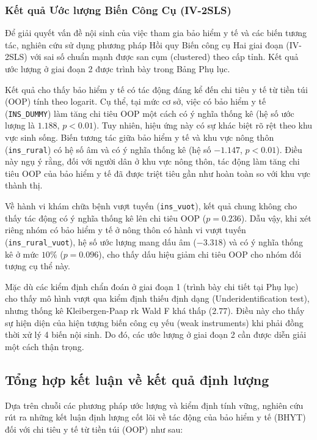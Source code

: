 \documentclass[12pt,a4paper]{article}
\begin{document}
\subsubsection{Kết quả Ước lượng Biến Công Cụ (IV-2SLS)}

Để giải quyết vấn đề nội sinh của việc tham gia bảo hiểm y tế và các biến tương tác, nghiên cứu sử dụng phương pháp Hồi quy Biến công cụ Hai giai đoạn (IV-2SLS) với sai số chuẩn mạnh được san cụm (clustered) theo cấp tỉnh. Kết quả ước lượng ở giai đoạn 2 được trình bày trong Bảng \label{tab:iv_appendix} Phụ lục.

Kết quả cho thấy bảo hiểm y tế có tác động đáng kể đến chi tiêu y tế từ tiền túi (OOP) tính theo logarit. Cụ thể, tại mức cơ sở, việc có bảo hiểm y tế (\texttt{INS\_DUMMY}) làm tăng chi tiêu OOP một cách có ý nghĩa thống kê (hệ số ước lượng là $\mathbf{1.188}$, $p < 0.01$). Tuy nhiên, hiệu ứng này có sự khác biệt rõ rệt theo khu vực sinh sống. Biến tương tác giữa bảo hiểm y tế và khu vực nông thôn (\texttt{ins\_rural}) có hệ số âm và có ý nghĩa thống kê (hệ số $\mathbf{-1.147}$, $p < 0.01$). Điều này ngụ ý rằng, đối với người dân ở khu vực nông thôn, tác động làm tăng chi tiêu OOP của bảo hiểm y tế đã được triệt tiêu gần như hoàn toàn so với khu vực thành thị.

Về hành vi khám chữa bệnh vượt tuyến (\texttt{ins\_vuot}), kết quả chung không cho thấy tác động có ý nghĩa thống kê lên chi tiêu OOP ($p = 0.236$). Dẫu vậy, khi xét riêng nhóm có bảo hiểm y tế ở nông thôn có hành vi vượt tuyến (\texttt{ins\_rural\_vuot}), hệ số ước lượng mang dấu âm ($\mathbf{-3.318}$) và có ý nghĩa thống kê ở mức $10\%$ ($p = 0.096$), cho thấy dấu hiệu giảm chi tiêu OOP cho nhóm đối tượng cụ thể này. 

Mặc dù các kiểm định chẩn đoán ở giai đoạn 1 (trình bày chi tiết tại Phụ lục) cho thấy mô hình vượt qua kiểm định thiếu định dạng (Underidentification test), nhưng thống kê Kleibergen-Paap rk Wald F khá thấp ($\mathbf{2.77}$). Điều này cho thấy sự hiện diện của hiện tượng biến công cụ yếu (weak instruments) khi phải đồng thời xử lý 4 biến nội sinh. Do đó, các ước lượng ở giai đoạn 2 cần được diễn giải một cách thận trọng.

\subsection{Tổng hợp kết luận về kết quả định lượng}

Dựa trên chuỗi các phương pháp ước lượng và kiểm định tính vững, nghiên cứu rút ra những kết luận định lượng cốt lõi về tác động của bảo hiểm y tế (BHYT) đối với chi tiêu y tế từ tiền túi (OOP) như sau:
\end{document}
